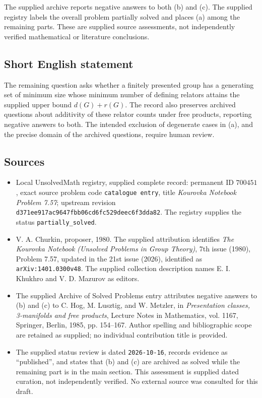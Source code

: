 \documentclass[11pt]{article}
\begin{document}
The supplied archive reports negative answers to both (b) and (c). The supplied registry labels the overall problem partially solved and places (a) among the remaining parts. These are supplied source assessments, not independently verified mathematical or literature conclusions.
\subsection{Short English statement}
The remaining question asks whether a finitely presented group has a generating set of minimum size whose minimum number of defining relators attains the supplied upper bound \(d(G)+r(G)\). The record also preserves archived questions about additivity of these relator counts under free products, reporting negative answers to both. The intended exclusion of degenerate cases in (a), and the precise domain of the archived questions, require human review.
\subsection{Sources}
\begin{itemize}
\item Local UnsolvedMath registry, supplied complete record: permanent ID \(700451\), exact source problem code \texttt{catalogue entry}, title \emph{Kourovka Notebook Problem 7.57}; upstream revision \texttt{d371ee917ac9647fbb06cd6fc529deec6f3dda82}. The registry supplies the status \texttt{partially\_solved}.
\item V. A. Churkin, proposer, 1980. The supplied attribution identifies \emph{The Kourovka Notebook (Unsolved Problems in Group Theory)}, 7th issue (1980), Problem 7.57, updated in the 21st issue (2026), identified as \texttt{arXiv:1401.0300v48}. The supplied collection description names E. I. Khukhro and V. D. Mazurov as editors.
\item The supplied Archive of Solved Problems entry attributes negative answers to (b) and (c) to C. Hog, M. Lusztig, and W. Metzler, in \emph{Presentation classes, 3-manifolds and free products}, Lecture Notes in Mathematics, vol. 1167, Springer, Berlin, 1985, pp. 154--167. Author spelling and bibliographic scope are retained as supplied; no individual contribution title is provided.
\item The supplied status review is dated \texttt{2026-10-16}, records evidence as ``published'', and states that (b) and (c) are archived as solved while the remaining part is in the main section. This assessment is supplied dated curation, not independently verified. No external source was consulted for this draft.
\end{itemize}
\end{document}
